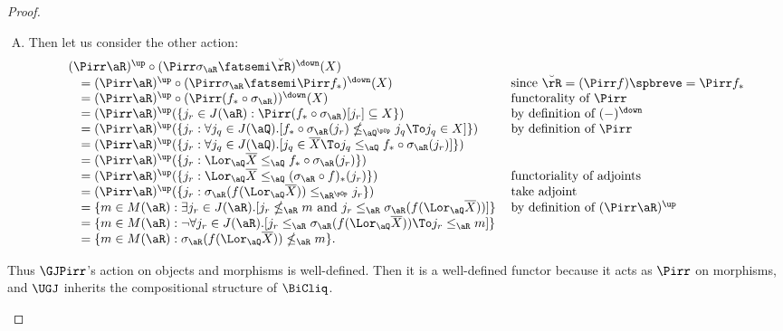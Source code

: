 \documentclass{article}
\begin{document}
\begin{proof}
\begin{enumerate}
\begin{enumerate}[(A)]
\item
Then let us consider the other action:
\[
\begin{tabular}{lll}
$(\Pirr\aR)^\up \circ (\Pirr\sigma_\aR \fatsemi \breve{\rR})^\down(X)$
\\ \quad
$= (\Pirr\aR)^\up \circ (\Pirr\sigma_\aR \fatsemi \Pirr f_*)^\down(X)$
& since $\breve{\rR} = (\Pirr f)\spbreve = \Pirr f_*$
\\ \quad
$= (\Pirr\aR)^\up \circ (\Pirr (f_* \circ \sigma_\aR) )^\down(X)$
& functorality of $\Pirr$
\\ \quad
$= (\Pirr\aR)^\up(\{ j_r \in J(\aR) : \Pirr(f_* \circ \sigma_\aR) [j_r] \subseteq X \})$
& by definition of $(-)^\down$
\\ \quad
$= (\Pirr\aR)^\up(\{ j_r : \forall j_q \in J(\aQ).[f_* \circ \sigma_\aR(j_r) \nleq_{\aQ^{\pOp}} j_q \To j_q \in X  ] \})$
& by definition of $\Pirr$
\\ \quad
$= (\Pirr\aR)^\up(\{ j_r : \forall j_q \in J(\aQ).[j_q \in \overline{X} \To j_q \leq_\aQ f_* \circ \sigma_\aR(j_r) ]  \})$
\\ \quad
$= (\Pirr\aR)^\up(\{ j_r : \Lor_\aQ \overline{X} \leq_\aQ f_* \circ \sigma_\aR(j_r) \})$
\\ \quad
$= (\Pirr\aR)^\up(\{ j_r : \Lor_\aQ \overline{X} \leq_\aQ (\sigma_\aR \circ f)_*(j_r) \})$
& functoriality of adjoints
\\ \quad
$= (\Pirr\aR)^\up(\{ j_r : \sigma_\aR(f(\Lor_\aQ \overline{X})) \leq_{\aR^{\pOp}} j_r \})$
& take adjoint
\\ \quad
$= \{ m \in M(\aR) : \exists j_r \in J(\aR).[ j_r \nleq_\aR m \text{ and } j_r \leq_\aR \sigma_\aR(f(\Lor_\aQ \overline{X})) ] \}$
& by definition of $(\Pirr\aR)^\up$
\\ \quad
$= \{ m \in M(\aR) : \neg\forall j_r \in J(\aR).[ j_r \leq_\aR \sigma_\aR(f(\Lor_\aQ \overline{X})) \To j_r \leq_\aR m  ] \}$
\\ \quad
$= \{ m \in M(\aR) : \sigma_\aR(f(\Lor_\aQ \overline{X})) \nleq_\aR m \}$.
\end{tabular}
\]
\end{enumerate}

Thus $\GJPirr$'s action on objects and morphisms is well-defined. Then it is a well-defined functor because it acts as $\Pirr$ on morphisms, and $\UGJ$ inherits the compositional structure of $\BiCliq$.



\end{enumerate}
\end{proof}
\end{document}
